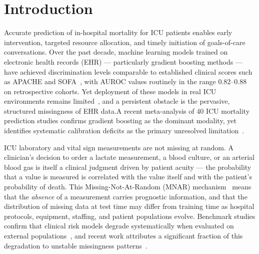 \documentclass[a4paper,fleqn,longmktitle]{cas-sc}
\begin{document}
	
	
	
	
	\section{Introduction}
	\label{sec:introduction}
	
	Accurate prediction of in-hospital mortality for ICU patients
	enables early intervention, targeted resource allocation, and timely
	initiation of goals-of-care conversations.
	Over the past decade, machine learning models trained on electronic
	health records (EHR) — particularly gradient boosting methods —
	have achieved discrimination levels comparable to established clinical
	scores such as APACHE and
	SOFA~\citep{purushotham2018benchmarking, johnson2023mimic},
	with AUROC values routinely in the range 0.82--0.88 on
	retrospective cohorts.
	Yet deployment of these models in real ICU environments
	remains limited~\citep{topol2019high}, and a persistent
	obstacle is the pervasive, structured missingness of EHR data.A recent meta-analysis of 40 ICU mortality prediction studies
	confirms gradient boosting as the dominant modality, yet
	identifies systematic calibration deficits as the primary
	unresolved limitation~\citep{sun2025meta}.
	
	ICU laboratory and vital sign measurements are not missing at random.
	A clinician's decision to order a lactate measurement, a blood
	culture, or an arterial blood gas is itself a clinical judgment
	driven by patient acuity — the probability that a value is
	measured is correlated with the value itself and with the
	patient's probability of death.
	This Missing-Not-At-Random (MNAR) mechanism~\citep{rubin1976inference}
	means that the \emph{absence} of a measurement carries prognostic
	information, and that the distribution of missing data at test time
	may differ from training time as hospital protocols, equipment,
	staffing, and patient populations evolve.
	Benchmark studies confirm that clinical risk models degrade
	systematically when evaluated on external
	populations~\citep{moons2012risk}, and recent work attributes
	a significant fraction of this degradation to unstable missingness
	patterns~\citep{agniel2018biases, josse2019consistency}.
	
\end{document}
